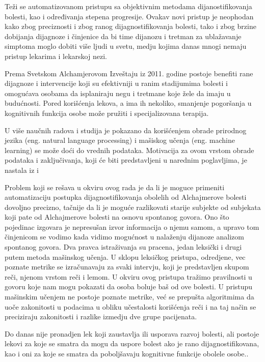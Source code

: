 \documentclass[12pt,oneside]{memoir}
\begin{document}
Teži se automatizovanom pristupu sa objektivnim metodama dijanostifikovanja bolesti,  kao i određivanja stepena progresije.  Ovakav novi pristup je neophodan kako zbog preciznosti i zbog ranog dijagnostifikovanja bolesti,  tako i zbog brzine dobijanja dijagnoze i činjenice da bi time dijanozu i tretman za ublažavanje simptoma moglo dobiti više ljudi u svetu, medju kojima danas mnogi nemaju pristup lekarima i lekarskoj nezi.  

Prema Svetskom Alchamjerovom Izveštaju iz 2011. godine postoje benefiti rane dijagnoze i intervencije koji su efektivniji u ranim stadijumima bolesti i omogućava osobama da isplaniraju negu i tretmane koje žele da imaju u budućnosti. Pored korišćenja lekova, a ima ih nekoliko,  smanjenje pogoršanja u kognitivnih funkcija osobe može pružiti i specijalizovana terapija. 

U više naučnih radova i studija je pokazano da korišćenjem obrade prirodnog jezika (eng. natural language processing) i mašiskog učenja (eng. machine learning) se može doći do vrednih podataka.  Motivacija za ovom vrstom obrade podataka i zaključivanja,  koji će biti predstavljeni u narednim poglavljima,  je nastala iz \cite{automatic_det_and_rat} i  \cite{linguistic_features}

Problem koji se rešava u okviru ovog rada je da li je moguce primeniti automatizaciju postupka dijagnostifikovanja obolelih od Alchajmerove bolesti dovoljno precizno, tačnije da li je moguće razlikovati starije subjekte od subjekata koji pate od  Alchajmerove bolesti na osnovu spontanog govora.  Ono što pojedinac izgovara je nepresušan izvor informacija o njemu samom,  a upravo tom činjenicom se vodimo kada vidimo mogućnost u nalaženju dijanoze analizom spontanog govora.  Dva pravca istraživanja su pracena,  jedan leksički i drugi putem metoda mašinskog učenja.  U sklopu leksičkog pristupa,  odredjene, vec poznate metrike se izračunavaju za svaki intervju,  koji je predstavljen skupom reči,  njenom vrstom reči i lemom.  U okviru ovog pristupa tražimo pravilnosti u govoru koje nam mogu pokazati da osoba boluje baš od ove bolesti.  U pristupu mašinskim učenjem ne postoje poznate metrike,  već se prepušta algoritmima da uoče zakonitosti u podacima u obliku učestalosti korišćenja reči i na taj način se preciziraju zakonitosti i razlike izmedju dve grupe pacijenata. 

Do danas nije pronadjen lek koji zaustavlja ili usporava razvoj bolesti, ali postoje lekovi za koje se smatra da mogu da uspore bolest ako je rano dijagnostifikovana, kao i oni za koje se smatra da poboljšavaju kognitivne funkcije obolele osobe.\cite{Alzheimer_facts_figures}.  
\end{document}
